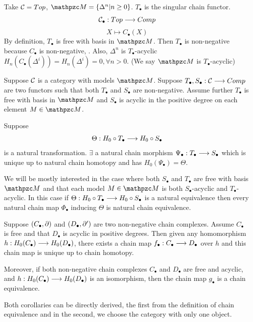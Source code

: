 \documentclass[11pt]{book} %
\begin{document}
\begin{example}
Take ${\cal C}=Top$, $\pzm=\{\Delta^n|n\geq 0\}$.  $T_\bullet$ is the singular chain functor.
$$
{\cal C}_\bullet: Top\longrightarrow Comp
$$
$$
X\mapsto C_\bullet(X)
$$
By definition, $T_\bullet$ is free with basis in $\pzm$.
Then $T_\bullet$ is non-negative because
$C_\bullet$ is non-negative, \checkmark. Also, $\Delta^n$ is $T_\bullet$-acyclic
$H_n(C_\bullet(\Delta^i))=H_n(\Delta^i)=0,\forall n>0$\checkmark. (We say $\pzm$ is $T_\bullet$-acyclic)
\end{example}
\begin{theorem}\label{apendix:thm:Acyclic_models_theorem}
Suppose ${\cal C}$ is a category with models $\pzm$. Suppose $T_\bullet, S_\bullet:{\cal C}\longrightarrow Comp$ are two functors such that both $T_\bullet$ and $S_\bullet$ are non-negative. Assume further $T_\bullet$ is free with basis in $\pzm$ and $S_\bullet$ is acyclic in the positive degree on each element $M\in\pzm$.

Suppose 
$$
\Theta: H_0\circ T_\bullet\longrightarrow H_0\circ S_\bullet
$$
 is a natural transformation. $\exists $ a  natural chain morphism $\Psi_\bullet:T_\bullet\longrightarrow S_\bullet$ which is unique up to natural chain homotopy and has $H_0(\Psi_\bullet)=\Theta$.
\end{theorem}
\begin{corollary}
We will be mostly interested in the case where both $S_\bullet$ and $T_\bullet$ are free with basis $\pzm$ and that each model $M\in\pzm$ is both $S_\bullet$-acyclic and $T_\bullet$-acyclic. In this case if $\Theta: H_0\circ T_\bullet\longrightarrow H_0\circ S_\bullet$ is a natural equivalence then every natural chain map $\Phi_\bullet$ inducing $\Theta$ is natural chain equivalence.
\end{corollary}
\begin{corollary}\label{appendixAcor:chain_homotopy_over_H0(f)_free_acyclic}
Suppose $(C_\bullet, {\partial})$ and $(D_\bullet, {\partial}')$ are two non-negative chain complexes. Assume $C_\bullet$ is free and that $D_\bullet$ is acyclic in positive degrees. Then given any homomorphism $h: H_0(C_\bullet)\longrightarrow H_0(D_\bullet)$, there exists a chain map $f_\bullet: C_\bullet\longrightarrow D_\bullet$ over $h$ and this chain map is unique up to chain homotopy.

Moreover, if both non-negative chain complexes $C_\bullet$ and $D_\bullet$ are free and acyclic, and $h: H_0(C_\bullet)\longrightarrow H_0(D_\bullet)$ is an isomorphism, then the chain map $g_\bullet$ is a chain equivalence.
\end{corollary}
Both corollaries can be directly derived, the first from the definition of chain equivalence and in the second, we choose the category with only one object.
\end{document}
